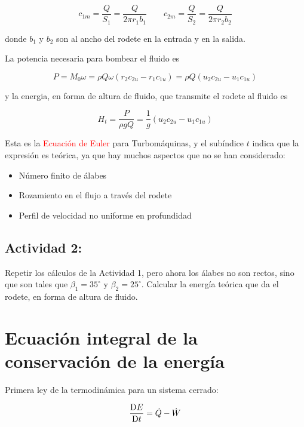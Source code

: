 \begin{equation}
	c_{1m}=\frac{Q}{S_{1}}=\frac{Q}{2\pi r_{1}b_{1}}\qquad c_{2m}=\frac{Q}{S_{2}}=\frac{Q}{2\pi r_{2}b_{2}}
\end{equation}

donde $b_{1}$ y $b_{2}$ son al ancho del rodete en la entrada y
en la salida.



La potencia necesaria para bombear el fluido es 

\begin{equation}
	P=M_{0}\omega=\rho Q\omega\left(r_{2}c_{2u}-r_{1}c_{1u}\right)=\rho Q\left(u_{2}c_{2u}-u_{1}c_{1u}\right)
\end{equation}

y la energia, en forma de altura de fluido, que transmite el rodete
al fluido es 

\begin{equation}
	\boxed{H_{t}=\frac{P}{\rho gQ}=\frac{1}{g}\left(u_{2}c_{2u}-u_{1}c_{1u}\right)}
\end{equation}


Esta es la \textcolor{red}{Ecuación de Euler} para Turbomáquinas,
y el subíndice $t$ indica que la expresión es teórica, ya que hay
muchos aspectos que no se han considerado: 
\begin{itemize}
	\item Número finito de álabes 
	\item Rozamiento en el flujo a través del rodete 
	\item Perfil de velocidad no uniforme en profundidad 
\end{itemize}


\subsection*{Actividad 2:}
	Repetir los cálculos de la Actividad 1, pero ahora los álabes no
	son rectos, sino que son tales que $\beta_{1}=35^{\circ}$ y $\beta_{2}=25^{\circ}$.
	Calcular la energía teórica que da el rodete, en forma de altura de
	fluido. 

\section{Ecuación integral de la conservación de la energía}

	
	Primera ley de la termodinámica para un sistema cerrado: 
	
	\begin{equation}
		\frac{\text{D} E}{\text{D} t}=\dot{Q}-\dot{W}
	\end{equation}
	
